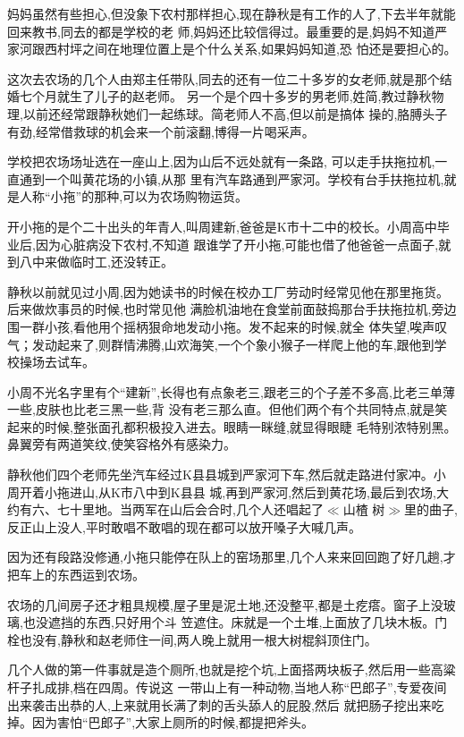 ﻿\documentclass[12pt]{article}
\begin{document}
妈妈虽然有些担心,但没象下农村那样担心,现在静秋是有工作的人了,下去半年就能回来教书,同去的都是学校的老
师,妈妈还比较信得过。最重要的是,妈妈不知道严家河跟西村坪之间在地理位置上是个什么关系,如果妈妈知道,恐
怕还是要担心的。

这次去农场的几个人由郑主任带队,同去的还有一位二十多岁的女老师,就是那个结婚七个月就生了儿子的赵老师。
另一个是个四十多岁的男老师,姓简,教过静秋物理,以前还经常跟静秋她们一起练球。简老师人不高,但以前是搞体
操的,胳膊头子有劲,经常借救球的机会来一个前滚翻,博得一片喝采声。

学校把农场场址选在一座山上,因为山后不远处就有一条路, 可以走手扶拖拉机,一直通到一个叫黄花场的小镇,从那
里有汽车路通到严家河。学校有台手扶拖拉机,就是人称``小拖''的那种,可以为农场购物运货。

开小拖的是个二十出头的年青人,叫周建新,爸爸是K市十二中的校长。小周高中毕业后,因为心脏病没下农村,不知道
跟谁学了开小拖,可能也借了他爸爸一点面子,就到八中来做临时工,还没转正。

静秋以前就见过小周,因为她读书的时候在校办工厂劳动时经常见他在那里拖货。后来做炊事员的时候,也时常见他
满脸机油地在食堂前面鼓捣那台手扶拖拉机,旁边围一群小孩,看他用个摇柄狠命地发动小拖。发不起来的时候,就全
体失望,唉声叹气；发动起来了,则群情沸腾,山欢海笑,一个个象小猴子一样爬上他的车,跟他到学校操场去试车。

小周不光名字里有个``建新'',长得也有点象老三,跟老三的个子差不多高,比老三单薄一些,皮肤也比老三黑一些,背
没有老三那么直。但他们两个有个共同特点,就是笑起来的时候,整张面孔都积极投入进去。眼睛一眯缝,就显得眼睫
毛特别浓特别黑。鼻翼旁有两道笑纹,使笑容格外有感染力。

静秋他们四个老师先坐汽车经过K县县城到严家河下车,然后就走路进付家冲。小周开着小拖进山,从K市八中到K县县
城,再到严家河,然后到黄花场,最后到农场,大约有六、七十里地。当两军在山后会合时,几个人还唱起了$\ll$山楂
树$\gg$里的曲子,反正山上没人,平时敢唱不敢唱的现在都可以放开嗓子大喊几声。

因为还有段路没修通,小拖只能停在队上的窑场那里,几个人来来回回跑了好几趟,才把车上的东西运到农场。

农场的几间房子还才粗具规模,屋子里是泥土地,还没整平,都是土疙瘩。窗子上没玻璃,也没遮挡的东西,只好用个斗
笠遮住。床就是一个土堆,上面放了几块木板。门栓也没有,静秋和赵老师住一间,两人晚上就用一根大树棍斜顶住门。

几个人做的第一件事就是造个厕所,也就是挖个坑,上面搭两块板子,然后用一些高粱杆子扎成排,档在四周。传说这
一带山上有一种动物,当地人称``巴郎子'',专爱夜间出来袭击出恭的人,上来就用长满了刺的舌头舔人的屁股,然后
就把肠子挖出来吃掉。因为害怕``巴郎子'',大家上厕所的时候,都提把斧头。
\end{document}
